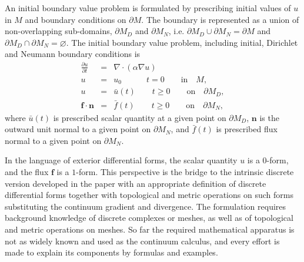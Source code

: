 \documentclass{elsarticle}
\theoremstyle{definition}
\begin{document}
An initial boundary value problem is formulated by prescribing initial values of $u$ in $M$ and boundary conditions on $\partial M$. The boundary is represented as a union of non-overlapping sub-domains, $\partial M_D$ and $\partial M_N$, i.e. $\partial M_D \cup \partial M_N = \partial M$ and $\partial M_D \cap \partial M_N = \varnothing$. The initial boundary value problem, including initial, Dirichlet and Neumann boundary conditions is
\begin{eqnarray*} 
\label{eq:heat}
  \frac{\partial u}{\partial t} &=& {\nabla} \cdot {(\alpha \nabla u)} \\
\label{eq:Initial}
  u &=& u_0 \quad \quad \quad t =0 \quad\quad \textrm{in} \quad M,\\
\label{eq:Dirichlet}
  u &=& \bar{u}(t) \quad \quad t \ge 0 \quad \quad \textrm{on} \quad \partial M_D,\\
\label{eq:Neumann}
  \mathbf{f} \cdot \mathbf{n} &=& \bar{f}(t) \quad \quad t \ge 0 \quad \quad \textrm{on} \quad \partial M_N,
\end{eqnarray*}
where $\bar{u}(t)$ is prescribed scalar quantity at a given point on $\partial M_D$, $\mathbf{n}$ is the outward unit normal to a given point on $\partial M_N$, and $\bar{f}(t)$ is prescribed flux normal to a given point on $\partial M_N$.

In the language of exterior differential forms, the scalar quantity $u$ is a $0$-form, and the flux $\mathbf{f}$ is a $1$-form. This perspective is the bridge to the intrinsic discrete version developed in the paper with an appropriate definition of discrete differential forms together with topological and metric operations on such forms substituting the continuum gradient and divergence. The formulation requires background knowledge of discrete complexes or meshes, as well as of topological and metric operations on meshes. So far the required mathematical apparatus is not as widely known and used as the continuum calculus, and every effort is made to explain its components by formulas and examples.
\end{document}
